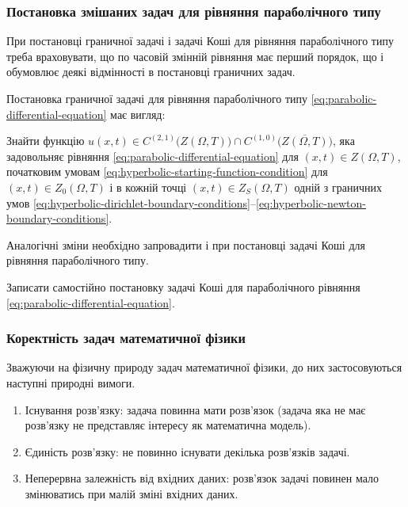 \subsubsection{Постановка змішаних задач для рівняння параболічного типу}

При постановці граничної задачі і задачі Коші для рівняння параболічного типу треба враховувати, що по часовій змінній рівняння має перший порядок, що і обумовлює деякі відмінності в постановці граничних задач. \medskip

Постановка граничної задачі для рівняння параболічного типу \eqref{eq:parabolic-differential-equation} має вигляд:
\begin{problem_formulation*}
    Знайти функцію $u(x, t) \in C^{(2, 1)} \Big( Z(\Omega, T) \Big) \cap C^{(1, 0)} \Big( \overline {Z(\Omega, T)} \Big)$, яка задовольняє рівняння \eqref{eq:parabolic-differential-equation} для $(x, t) \in Z(\Omega, T)$, початковим умовам \eqref{eq:hyperbolic-starting-function-condition} для $(x, t) \in Z_0(\Omega, T)$ і в кожній точці $(x, t) \in Z_S(\Omega, T)$ одній з граничних умов \eqref{eq:hyperbolic-dirichlet-boundary-conditions}--\eqref{eq:hyperbolic-newton-boundary-conditions}.
\end{problem_formulation*}

Аналогічні зміни необхідно запровадити і при постановці задачі Коші для рівняння параболічного типу.

\begin{exercise}
    Записати самостійно постановку задачі Коші для параболічного рівняння \eqref{eq:parabolic-differential-equation}.
\end{exercise}

\subsubsection{Коректність задач математичної фізики}

Зважуючи на фізичну природу задач математичної фізики, до них застосовуються наступні природні вимоги.
\begin{enumerate}
    \item Існування розв'язку: задача повинна мати розв'язок (задача яка не має розв'язку не представляє інтересу як математична модель).
    \item Єдиність розв’язку: не повинно існувати декілька розв'язків задачі.
    \item Неперервна залежність від вхідних даних: розв'язок задачі повинен мало змінюватись при малій зміні вхідних даних.
\end{enumerate}

